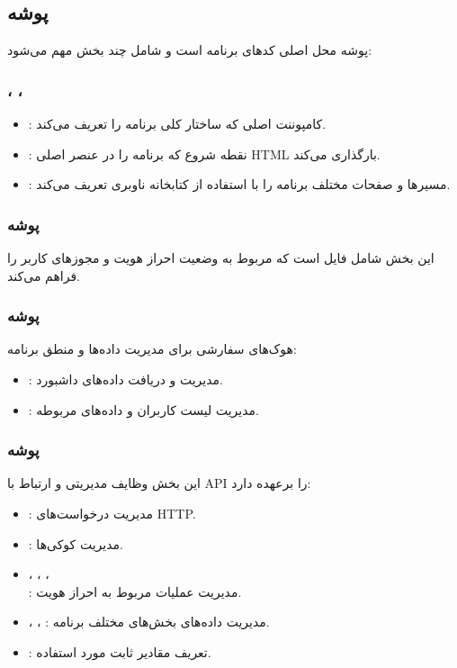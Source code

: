     \subsection{پوشه }
    پوشه  محل اصلی کدهای برنامه است و شامل چند بخش مهم می‌شود:
    
    \subsubsection{، ، }
    \begin{itemize}
    	\item {}: کامپوننت اصلی که ساختار کلی برنامه را تعریف می‌کند.
    	\item {}: نقطه شروع  که برنامه را در عنصر اصلی HTML بارگذاری می‌کند.
    	\item {}: مسیرها و صفحات مختلف برنامه را با استفاده از کتابخانه ناوبری تعریف می‌کند.
    \end{itemize}
    
    \subsubsection{پوشه }
    این بخش شامل فایل  است که  مربوط به وضعیت احراز هویت و مجوزهای کاربر را فراهم می‌کند.
    
    \subsubsection{پوشه }
    هوک‌های سفارشی برای مدیریت داده‌ها و منطق برنامه:
    \begin{itemize}
    	\item {}: مدیریت و دریافت داده‌های داشبورد.
    	\item {}: مدیریت لیست کاربران و داده‌های مربوطه.
    \end{itemize}
    
    \subsubsection{پوشه }
    این بخش وظایف مدیریتی و ارتباط با API را برعهده دارد:
    \begin{itemize}
    	\item {}: مدیریت درخواست‌های HTTP.
    	\item {}: مدیریت کوکی‌ها.
    	\item {}، ، ،\\ : مدیریت عملیات مربوط به احراز هویت.
    	\item {}، ، : مدیریت داده‌های بخش‌های مختلف برنامه.
    	\item {}: تعریف مقادیر ثابت مورد استفاده.
    \end{itemize}
    
